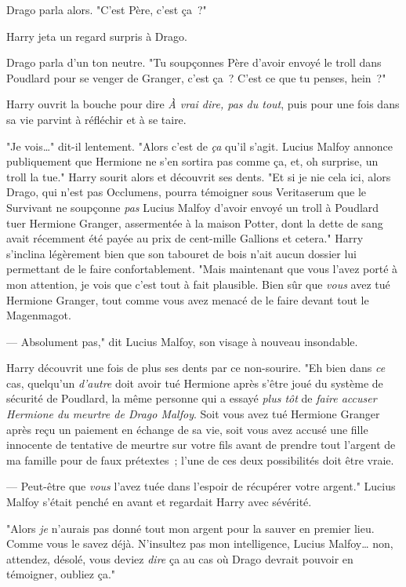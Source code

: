 Drago parla alors. "C'est Père, c'est ça~?"

Harry jeta un regard surpris à Drago.

Drago parla d'un ton neutre. "Tu soupçonnes Père d'avoir envoyé le troll dans Poudlard pour se venger de Granger, c'est ça~? C'est ce que tu penses, hein~?"

Harry ouvrit la bouche pour dire \emph{À vrai dire, pas du tout}, puis pour une fois dans sa vie parvint à réfléchir et à se taire.

"Je vois…" dit-il lentement. "Alors c'est de \emph{ça} qu'il s'agit. Lucius Malfoy annonce publiquement que Hermione ne s'en sortira pas comme ça, et, oh surprise, un troll la tue." Harry sourit alors et découvrit ses dents. "Et si je nie cela ici, alors Drago, qui n'est pas Occlumens, pourra témoigner sous Veritaserum que le Survivant ne soupçonne \emph{pas} Lucius Malfoy d'avoir envoyé un troll à Poudlard tuer Hermione Granger, assermentée à la maison Potter, dont la dette de sang avait récemment été payée au prix de cent-mille Gallions et cetera." Harry s'inclina légèrement bien que son tabouret de bois n'ait aucun dossier lui permettant de le faire confortablement. "Mais maintenant que vous l'avez porté à mon attention, je vois que c'est tout à fait plausible. Bien sûr que \emph{vous} avez tué Hermione Granger, tout comme vous avez menacé de le faire devant tout le Magenmagot.

--- Absolument pas," dit Lucius Malfoy, son visage à nouveau insondable.

Harry découvrit une fois de plus ses dents par ce non-sourire. "Eh bien dans \emph{ce} cas, quelqu'un \emph{d'autre} doit avoir tué Hermione après s'être joué du système de sécurité de Poudlard, la même personne qui a essayé \emph{plus tôt} de \emph{faire accuser Hermione du meurtre de Drago Malfoy}. Soit vous avez tué Hermione Granger après reçu un paiement en échange de sa vie, soit vous avez accusé une fille innocente de tentative de meurtre sur votre fils avant de prendre tout l'argent de ma famille pour de faux prétextes~; l'une de ces deux possibilités doit être vraie.

--- Peut-être que \emph{vous} l'avez tuée dans l'espoir de récupérer votre argent." Lucius Malfoy s'était penché en avant et regardait Harry avec sévérité.

"Alors \emph{je} n'aurais pas donné tout mon argent pour la sauver en premier lieu. Comme vous le savez déjà. N'insultez pas mon intelligence, Lucius Malfoy… non, attendez, désolé, vous deviez \emph{dire} ça au cas où Drago devrait pouvoir en témoigner, oubliez ça."

